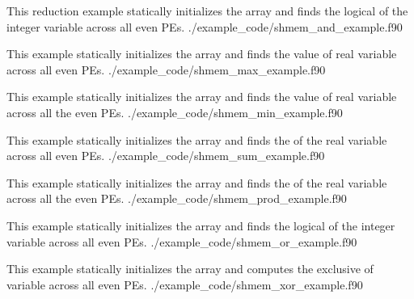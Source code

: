 \begin{apidefinition}


\begin{apiexamples}

\apifexample
    {This \Fortran reduction example statically initializes the  array
    and finds the logical  of the integer variable  across all
    even \acp{PE}.}
    {./example_code/shmem_and_example.f90}
    {}

\apifexample
    {This \Fortran example statically initializes the  array and finds
    the  value of real variable  across all even \acp{PE}.}
    {./example_code/shmem_max_example.f90}
    {}

\apifexample
    { This \Fortran example statically initializes the  array and finds
    the  value of real variable  across all the even
    \acp{PE}.}
    {./example_code/shmem_min_example.f90}
    {}

\apifexample
    {This \Fortran example statically initializes the  array and finds
    the  of the real variable  across all even \acp{PE}.}
    {./example_code/shmem_sum_example.f90}
    {}

\apifexample
    {This \Fortran example statically initializes the  array and finds
    the  of the real variable  across all the even \acp{PE}.}
    {./example_code/shmem_prod_example.f90}
    {}

\apifexample
    {This \Fortran example statically initializes the  array and finds
    the logical  of the integer variable  across all even
    \acp{PE}.}
    {./example_code/shmem_or_example.f90}
    {}

\apifexample
    {This \Fortran example statically initializes the  array and
    computes the exclusive  of variable  across all even
    \acp{PE}.}
    {./example_code/shmem_xor_example.f90}
    {}

\end{apiexamples}

\end{apidefinition}
